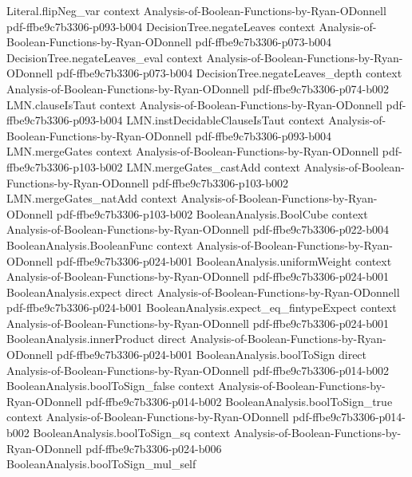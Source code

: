 \begin{lemma}
  {Literal.flipNeg_var}
  {context}
  {Analysis-of-Boolean-Functions-by-Ryan-ODonnell}
  {pdf-ffbe9c7b3306-p093-b004}
\proofstep
  {DecisionTree.negateLeaves}
  {context}
  {Analysis-of-Boolean-Functions-by-Ryan-ODonnell}
  {pdf-ffbe9c7b3306-p073-b004}
\proofstep
  {DecisionTree.negateLeaves_eval}
  {context}
  {Analysis-of-Boolean-Functions-by-Ryan-ODonnell}
  {pdf-ffbe9c7b3306-p073-b004}
\proofstep
  {DecisionTree.negateLeaves_depth}
  {context}
  {Analysis-of-Boolean-Functions-by-Ryan-ODonnell}
  {pdf-ffbe9c7b3306-p074-b002}
\proofstep
  {LMN.clauseIsTaut}
  {context}
  {Analysis-of-Boolean-Functions-by-Ryan-ODonnell}
  {pdf-ffbe9c7b3306-p093-b004}
\proofstep
  {LMN.instDecidableClauseIsTaut}
  {context}
  {Analysis-of-Boolean-Functions-by-Ryan-ODonnell}
  {pdf-ffbe9c7b3306-p093-b004}
\proofstep
  {LMN.mergeGates}
  {context}
  {Analysis-of-Boolean-Functions-by-Ryan-ODonnell}
  {pdf-ffbe9c7b3306-p103-b002}
\proofstep
  {LMN.mergeGates_castAdd}
  {context}
  {Analysis-of-Boolean-Functions-by-Ryan-ODonnell}
  {pdf-ffbe9c7b3306-p103-b002}
\proofstep
  {LMN.mergeGates_natAdd}
  {context}
  {Analysis-of-Boolean-Functions-by-Ryan-ODonnell}
  {pdf-ffbe9c7b3306-p103-b002}
\proofstep
  {BooleanAnalysis.BoolCube}
  {context}
  {Analysis-of-Boolean-Functions-by-Ryan-ODonnell}
  {pdf-ffbe9c7b3306-p022-b004}
\proofstep
  {BooleanAnalysis.BooleanFunc}
  {context}
  {Analysis-of-Boolean-Functions-by-Ryan-ODonnell}
  {pdf-ffbe9c7b3306-p024-b001}
\proofstep
  {BooleanAnalysis.uniformWeight}
  {context}
  {Analysis-of-Boolean-Functions-by-Ryan-ODonnell}
  {pdf-ffbe9c7b3306-p024-b001}
\proofstep
  {BooleanAnalysis.expect}
  {direct}
  {Analysis-of-Boolean-Functions-by-Ryan-ODonnell}
  {pdf-ffbe9c7b3306-p024-b001}
\proofstep
  {BooleanAnalysis.expect_eq_fintypeExpect}
  {context}
  {Analysis-of-Boolean-Functions-by-Ryan-ODonnell}
  {pdf-ffbe9c7b3306-p024-b001}
\proofstep
  {BooleanAnalysis.innerProduct}
  {direct}
  {Analysis-of-Boolean-Functions-by-Ryan-ODonnell}
  {pdf-ffbe9c7b3306-p024-b001}
\proofstep
  {BooleanAnalysis.boolToSign}
  {direct}
  {Analysis-of-Boolean-Functions-by-Ryan-ODonnell}
  {pdf-ffbe9c7b3306-p014-b002}
\proofstep
  {BooleanAnalysis.boolToSign_false}
  {context}
  {Analysis-of-Boolean-Functions-by-Ryan-ODonnell}
  {pdf-ffbe9c7b3306-p014-b002}
\proofstep
  {BooleanAnalysis.boolToSign_true}
  {context}
  {Analysis-of-Boolean-Functions-by-Ryan-ODonnell}
  {pdf-ffbe9c7b3306-p014-b002}
\proofstep
  {BooleanAnalysis.boolToSign_sq}
  {context}
  {Analysis-of-Boolean-Functions-by-Ryan-ODonnell}
  {pdf-ffbe9c7b3306-p024-b006}
\proofstep
  {BooleanAnalysis.boolToSign_mul_self}

\end{lemma}
